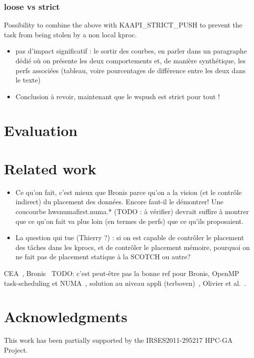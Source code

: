 \documentclass{Styles/llncs}
\begin{document}
\subsubsection{loose vs strict}

Possibility to combine the above with KAAPI\_STRICT\_PUSH to prevent the task from being stolen by a non local kproc.

\begin{itemize}
  \item pas d'impact significatif : le sortir des courbes, en parler
    dans un paragraphe dédié où on présente les deux comportements et,
    de manière synthétique, les perfs associées (tableau, voire
    pourcentages de différence entre les deux dans le texte)
  \item {\color{red}Conclusion à revoir, maintenant que le wspush est strict pour tout !}
\end{itemize}

\section{Evaluation}

\section{Related work}
\begin{itemize}
\item Ce qu'on fait, c'est mieux que Bronis parce qu'on a la vision
  (et le contrôle indirect) du placement des données. Encore faut-il
  le démontrer! Une coucourbe hwsnumafirst.numa.* (TODO : à vérifier)
  devrait suffire à montrer que ce qu'on fait va plus loin (en termes
  de perfs) que ce qu'ils proposaient.
\item La question qui tue (Thierry ?) : si on est capable de contrôler le
  placement des tâches dans les kprocs, et de contrôler le placement
  mémoire, pourquoi on ne fait pas de placement statique à la SCOTCH
  ou autre?
\end{itemize}

CEA~\cite{DBLP:conf/europar/Clet-OrtegaCP14},
Bronis~\cite{DBLP:journals/sp/OlivierSSP13} TODO: c'est peut-être pas
la bonne ref pour Bronis, OpenMP task-scheduling et
NUMA~\cite{DBLP:journals/corr/Tahan14}, solution au niveau appli
(terboven)~\cite{DBLP:conf/europar/TerbovenSCM12}, Olivier et al.~\cite{DBLP:journals/ijhpca/OlivierPWSP12}.


\section*{Acknowledgments}

This work has been partially supported by the IRSES2011-295217
HPC-GA Project.

  \small 
  
\end{document}
